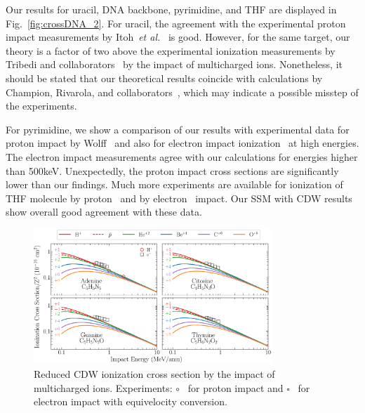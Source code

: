 \documentclass[10pt,showpacs,twocolumn]{revtex4}
\begin{document}
Our results for uracil, DNA backbone, pyrimidine, and THF are displayed 
in Fig.~\ref{fig:crossDNA_2}. For uracil, the agreement with the 
experimental proton impact measurements by 
Itoh~{\it et al.}~\cite{itoh2013} is good.
However, for the same target, our theory is a factor of two above 
the experimental ionization measurements by Tribedi and 
collaborators~\cite{agnihotri2012,agnihotri2013} by the impact of 
multicharged ions.
Nonetheless, it should be stated that our theoretical results coincide 
with calculations by Champion, Rivarola, and 
collaborators~\cite{agnihotri2012,champion2012}, which may indicate a 
possible misstep of the experiments. 

For pyrimidine, we show a comparison of our results with experimental 
data for proton impact by Wolff~\cite{wolff2014} and also for electron
impact ionization~\cite{bug2017} at high energies. 
The electron impact measurements 
agree with our calculations for energies higher than 500keV. 
Unexpectedly, the proton impact cross sections are significantly lower 
than our findings. 
Much more experiments are available for ionization of THF molecule by 
proton~\cite{wang2016} and by electron~\cite{bug2017,wolf2019,fuss2009} 
impact. Our SSM with CDW results show overall good agreement with these
data.

\begin{figure}[t!]
\centering
\includegraphics[width=0.8\textwidth]{adn1.eps}
\caption{Reduced CDW ionization cross section by the impact of 
multicharged ions. Experiments: \mbox{\Large$\circ$}~\cite{iriki2011} 
for proton impact and $\square$~\cite{rahman2016} for electron impact 
with equivelocity conversion.}
\label{fig:crossDNA_1}
\end{figure} 
\end{document}
